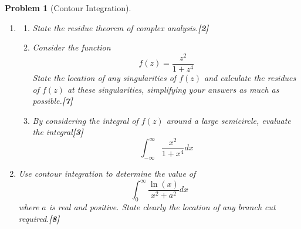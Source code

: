 \documentclass[a4paper]{article}
\theoremstyle{new}
\newtheorem{qns}{Problem}[section]
\begin{document}
\newpage
\begin{qns}[Contour Integration]\leavevmode
\begin{enumerate}[label=(\alph*)]
\item
\begin{enumerate}[label=(\roman*)]
\item State the residue theorem of complex analysis.\hfill\textbf{[2]}
\item Consider the function
$$f(z)=\frac{z^2}{1+z^4}$$
State the location of any singularities of $f(z)$ and calculate the residues of $f(z)$ at these singularities, simplifying your answers as much as possible.\hfill\textbf{[7]}
\item By considering the integral of $f(z)$ around a large semicircle, evaluate the integral\hfill\textbf{[3]}
$$\int_{-\infty}^\infty\frac{x^2}{1+x^4}dx$$
\end{enumerate}
\item Use contour integration to determine the value of
$$\int_0^\infty\frac{\ln(x)}{x^2+a^2}dx$$
where $a$ is real and positive. State clearly the location of any branch cut required.\hfill\textbf{[8]}
\end{enumerate}
\end{qns}
\end{document}
